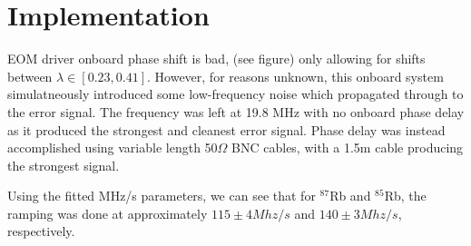 \newpage
\section{Implementation}

EOM driver onboard phase shift is bad, (see figure) only allowing for shifts between $\lambda \in [0.23, 0.41]$. However, for reasons unknown, this onboard system simulatneously introduced some low-frequency noise which propagated through to the error signal. The frequency was left at 19.8 MHz with no onboard phase delay as it produced the strongest and cleanest error signal. Phase delay was instead accomplished using variable length 50$\Omega$ BNC cables, with a 1.5m cable producing the strongest signal.



Using the fitted MHz/s parameters, we can see that for $^{87}$Rb and $^{85}$Rb, the ramping was done at approximately $115 \pm 4 Mhz/s$ and $140 \pm 3 Mhz/s$, respectively.